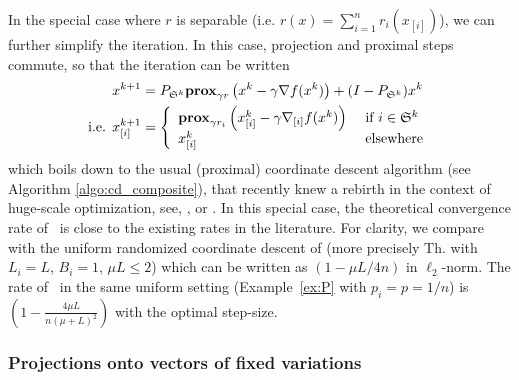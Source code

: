 In the special case where $r$ is separable (i.e. $r(x) = \sum_{i=1}^n r_i(x_{[i]})$), we can further simplify the iteration. In this case, projection and proximal steps commute, so that the iteration can be written
\begin{align*}
 x^{k+1} &=  P_{\mathfrak{S}^k}\mathbf{prox}_{\gamma r} \left( x^k - \gamma\nabla f(x^k)\right)  + (I -  P_{\mathfrak{S}^k}) x^k\\
\text{i.e. } x_{[i]}^{k+1} &= \left\{  \begin{array}{ll}
   \mathbf{prox}_{\gamma r_i} \left( x_{[i]}^k - \gamma\nabla_{[i]} f(x^k)\right) & \text{ if } i \in \mathfrak{S}^k  \\
   x_{[i]}^k  & \text{ elsewhere}
\end{array}  \right. 
\end{align*}
which boils down to the usual (proximal) coordinate descent algorithm (see Algorithm \ref{algo:cd_composite}), that recently knew a rebirth in the context of huge-scale optimization, see\;\cite{tseng2001convergence}, \cite{nesterov2012efficiency}, \cite{richtarik2014iteration} or \cite{wright2015coordinate}.
In this special case, the theoretical convergence rate of \algo~is close to the existing rates in the literature. 
For clarity, %
we compare with the uniform randomized coordinate descent of \cite{richtarik2014iteration} 
(more precisely Th. with $L_i =L$, $B_i=1$, $\mu L\leq 2$) which can be written as $\left(1 - \mu L/4n\right)$ in $\ell_2$-norm.
The rate of \algo~in the same uniform setting (Example~\ref{ex:P} with $p_i = p=1/n$) is $\left(1 - \frac{4\mu L}{n(\mu+ L)^2}\right)$ with the optimal step-size.

\subsubsection{Projections onto vectors of fixed variations}
\label{sec:var}

